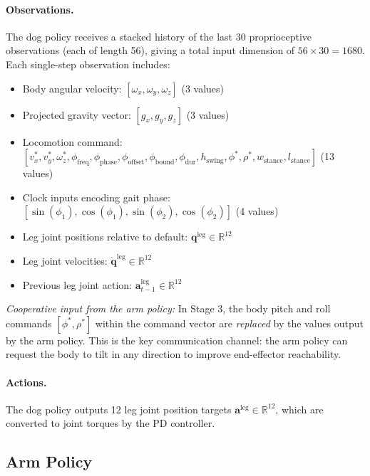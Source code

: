 \paragraph{Observations.}
The dog policy receives a stacked history of the last 30 proprioceptive
observations (each of length 56), giving a total input dimension of
$56 \times 30 = 1680$.
Each single-step observation includes:
\begin{itemize}
  \item Body angular velocity: $[\omega_x, \omega_y, \omega_z]$ (3 values)
  \item Projected gravity vector: $[g_x, g_y, g_z]$ (3 values)
  \item Locomotion command: $[v_x^*, v_y^*, \omega_z^*,
        \phi_{\text{freq}}, \phi_{\text{phase}}, \phi_{\text{offset}},
        \phi_{\text{bound}}, \phi_{\text{dur}}, h_{\text{swing}},
        \phi^*, \rho^*, w_{\text{stance}}, l_{\text{stance}}]$ (13 values)
  \item Clock inputs encoding gait phase: $[\sin(\phi_1), \cos(\phi_1),
        \sin(\phi_2), \cos(\phi_2)]$ (4 values)
  \item Leg joint positions relative to default: $\mathbf{q}^{\text{leg}} \in \mathbb{R}^{12}$
  \item Leg joint velocities: $\dot{\mathbf{q}}^{\text{leg}} \in \mathbb{R}^{12}$
  \item Previous leg joint action: $\mathbf{a}^{\text{leg}}_{t-1} \in \mathbb{R}^{12}$
\end{itemize}

\textit{Cooperative input from the arm policy:}
In Stage 3, the body pitch and roll commands $[\phi^*, \rho^*]$ within the
command vector are \emph{replaced} by the values output by the arm policy.
This is the key communication channel: the arm policy can request the body
to tilt in any direction to improve end-effector reachability.

\paragraph{Actions.}
The dog policy outputs 12 leg joint position targets
$\mathbf{a}^{\text{leg}} \in \mathbb{R}^{12}$, which are converted to
joint torques by the PD controller.

\subsection{Arm Policy}


